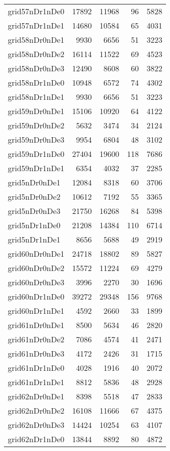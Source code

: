 \begin{tabular}{lrrrr}
grid57nDr1nDe0 & 17892 & 11968 & 96 & 5828 \\
grid57nDr1nDe1 & 14680 & 10584 & 65 & 4031 \\
grid58nDr0nDe1 & 9930 & 6656 & 51 & 3223 \\
grid58nDr0nDe2 & 16114 & 11522 & 69 & 4523 \\
grid58nDr0nDe3 & 12490 & 8608 & 60 & 3822 \\
grid58nDr1nDe0 & 10948 & 6572 & 74 & 4302 \\
grid58nDr1nDe1 & 9930 & 6656 & 51 & 3223 \\
grid59nDr0nDe1 & 15106 & 10920 & 64 & 4122 \\
grid59nDr0nDe2 & 5632 & 3474 & 34 & 2124 \\
grid59nDr0nDe3 & 9954 & 6804 & 48 & 3102 \\
grid59nDr1nDe0 & 27404 & 19600 & 118 & 7686 \\
grid59nDr1nDe1 & 6354 & 4032 & 37 & 2285 \\
grid5nDr0nDe1 & 12084 & 8318 & 60 & 3706 \\
grid5nDr0nDe2 & 10612 & 7192 & 55 & 3365 \\
grid5nDr0nDe3 & 21750 & 16268 & 84 & 5398 \\
grid5nDr1nDe0 & 21208 & 14384 & 110 & 6714 \\
grid5nDr1nDe1 & 8656 & 5688 & 49 & 2919 \\
grid60nDr0nDe1 & 24718 & 18802 & 89 & 5827 \\
grid60nDr0nDe2 & 15572 & 11224 & 69 & 4279 \\
grid60nDr0nDe3 & 3996 & 2270 & 30 & 1696 \\
grid60nDr1nDe0 & 39272 & 29348 & 156 & 9768 \\
grid60nDr1nDe1 & 4592 & 2660 & 33 & 1899 \\
grid61nDr0nDe1 & 8500 & 5634 & 46 & 2820 \\
grid61nDr0nDe2 & 7086 & 4574 & 41 & 2471 \\
grid61nDr0nDe3 & 4172 & 2426 & 31 & 1715 \\
grid61nDr1nDe0 & 4028 & 1916 & 40 & 2072 \\
grid61nDr1nDe1 & 8812 & 5836 & 48 & 2928 \\
grid62nDr0nDe1 & 8398 & 5518 & 47 & 2833 \\
grid62nDr0nDe2 & 16108 & 11666 & 67 & 4375 \\
grid62nDr0nDe3 & 14424 & 10254 & 63 & 4107 \\
grid62nDr1nDe0 & 13844 & 8892 & 80 & 4872 \\

\end{tabular}

